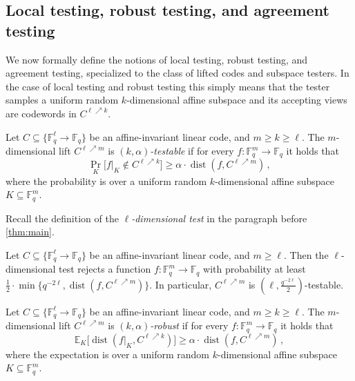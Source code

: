 \documentclass{toc}
\theoremstyle{plain}
\DeclareMathOperator{\dist}{dist} %
\DeclareMathOperator{\mindist}{mindist}  %
\newcommand{\E}{{\mathbb{E}}}
\newcommand{\F}{{\mathbb{F}}}
\newcommand{\Func}[1]{\{\F_q^{#1} \to \F_q\}}
\begin{document}


\subsection{Local testing, robust testing, and agreement testing}

We now formally define the notions of local testing, robust testing, and agreement testing, specialized to the class of lifted codes and subspace testers. In the case of local testing and robust testing this simply means that the tester samples a uniform random $k$-dimensional affine subspace and its
accepting views are codewords in $C^{\ell \nearrow k}$.

\begin{definition}
Let $C \subseteq \Func{\ell}$ be an affine-invariant linear  code, and $m\geq k \geq \ell$. The $m$-dimensional lift $C^{\ell \nearrow m}$ is \emph{$(k,\alpha)$-testable} if for every $f: \F_q^m \to \F_q$ it holds that
\[\Pr_K\big[f|_K \notin C^{\ell \nearrow k}\big] \geq \alpha \cdot \dist(f, C^{\ell \nearrow m})\,,\]
where the probability is over a uniform random $k$-dimensional affine subspace $K \subseteq \F_q^m$.
\end{definition}

%
%
Recall the definition of the \emph{$\ell$-dimensional test}
in the paragraph before \cref{thm:main}.   %

\begin{theorem}\label{lifted-testing}
  Let $C \subseteq\{\F_{q}^{\ell}\to\F_{q}\}$ be an affine-invariant linear  code, and $m \geq \ell$. Then the $\ell$-dimensional test
rejects a function $f: \F_q^m \to \F_q$ with probability at least $ \frac 1 2 \cdot \min \big \{ q^{-2\ell},  \dist(f, C^{\ell \nearrow m})\big\}$. In particular, $C^{\ell \nearrow m}$ is $\left(\ell,\frac  {q^{-2\ell}} {2}\right)$-testable.
\end{theorem}

\begin{definition}
Let $C \subseteq \Func{\ell}$ be an affine-invariant linear  code, and $m\geq k \geq \ell$.  The $m$-dimensional lift $C^{\ell \nearrow m}$ is \emph{ $(k,\alpha)$-robust} if for every $f: \F_q^m \to \F_q$ it holds that
\[\E_K\big[\dist(f|_K, C^{\ell \nearrow k})\big] \geq \alpha \cdot \dist(f, C^{\ell \nearrow m})\,,\]
where the expectation is over a uniform random $k$-dimensional affine subspace $K \subseteq \F_q^m$.
\end{definition}
\end{document}
